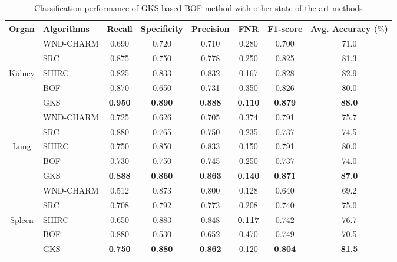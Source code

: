 \begin{table}
\centering
\footnotesize
\caption[Classification performance of GKS based BOF method with other methods]{\fontsize{10pt}{12pt}\selectfont Classification performance of GKS based BOF method with other state-of-the-art methods}
    \label{ch3:tab:adlp}
\renewcommand{\arraystretch}{1.3} 
\begin{tabular}{|c|l|c|c|c|c|c|c|}
\hline
\textbf{    Organ     }&\textbf{    Algorithms    }&\textbf{    Recall    }&\textbf{    Specificity    }&\textbf{    Precision    }&\textbf{    FNR    }&\textbf{    F1-score    }&\textbf{    Avg. Accuracy ($\%$)}\\
        \hline


        &    WND-CHARM    &    0.690&0.720& 0.710 & 0.280    &    0.700    &    71.0    \\
    &    SRC    &    0.875    &    0.750    &    0.778    &    0.250   &    0.825    & 81.3       \\
Kidney    &    SHIRC    &    0.825 & 0.833 &   0.832   & 0.167    &    0.828    & 82.9        \\
    &    BOF    &    0.870    &    0.650    &    0.731    &    0.350   &    0.826    &  80.0      \\
    &    GKS    &\textbf{    0.950    }&\textbf{    0.890    }&\textbf{    0.888    }&\textbf{    0.110    }&\textbf{     0.879   }&\textbf{    88.0    }\\
    \hline
    &    WND-CHARM &  0.725  & 0.626 &  0.705    &    0.374    &   0.791     &       75.7 \\
    &    SRC    &   0.880    &    0.765    & 0.750    &    0.235    &    0.737    &  74.5      \\
Lung    & SHIRC &  0.750& 0.850    &    0.833    &    0.150    &   0.791    &    80.0     \\
    &    BOF    & 0.730    &    0.750    &    0.745    &    0.250    &   0.737     &    74.0    \\
    &    GKS    & \textbf{ 0.888}    &\textbf{    0.860    }&\textbf{    0.863    }&\textbf{    0.140    }&\textbf{    0.871    }&\textbf{ 87.0       }\\
    \hline
    &    WND-CHARM    &    0.512    &    0.873    &    0.800    &    0.128    &    0.640    &     69.2   \\
    &    SRC    &    0.708    &    0.792    &    0.773    &    0.208    &   0.740     &   75.0     \\
Spleen    &    SHIRC    &    0.650    &    0.883    &    0.848    &    \textbf{   0.117  }  &     0.742    &   76.7    \\
    &    BOF    &    0.880    &    0.530    &    0.652    &    0.470    &      0.749   &  70.5     \\
    &    GKS    &\textbf{    0.750    }&\textbf{    0.880    }&\textbf{    0.862    }& 0.120    &\textbf{   0.804    }&\textbf{   81.5      }\\
\hline
\end{tabular}
\end{table}

